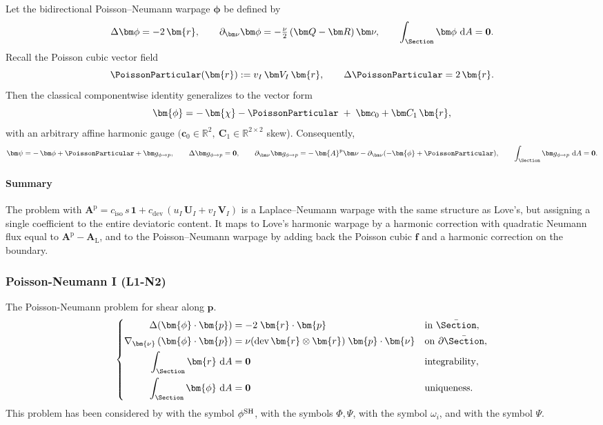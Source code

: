 Let the bidirectional Poisson–Neumann warpage $\bm{\phi}$ be defined by
\[
\Delta\bm\phi=-2\,\bm{r},\qquad
\partial_{\bm\nu}\bm\phi=-\tfrac{\nu}{2}\,(\bm Q-\bm R)\,\bm\nu,\qquad
\int_{\Section}\bm\phi\mathrm{~d}A=\mathbf{0}.
\]
Recall the Poisson cubic vector field
\[
\PoissonParticular(\bm{r}) := v_I\,\bm V_I\,\bm{r},\qquad \Delta \PoissonParticular = 2\,\bm{r}.
\]
Then the classical componentwise identity generalizes to the vector form
\[
\bm{\phi} = -\,\bm{\chi} - \PoissonParticular \;+\; \bm c_0 + \bm C_1\,\bm{r},
\]
with an arbitrary affine harmonic gauge $(\bm c_0\in\mathbb R^2,\ \bm C_1\in\mathbb R^{2\times 2}$ skew). Consequently,
\[
\bm\psi = -\,\bm\phi + \PoissonParticular + \bm g_{\phi\to p},\qquad
\Delta \bm g_{\phi\to p}=\mathbf{0},\qquad
\partial_{\bm\nu}\bm g_{\phi\to p}=-\,\bm{A}^{\mathrm p}\bm\nu - \partial_{\bm\nu}(-\bm{\phi}+\PoissonParticular),\qquad
\int_{\Section}\bm g_{\phi\to p}\mathrm{~d}A=\mathbf{0}.
\]

\paragraph{Summary}

The problem with $\bm{A}^{\mathrm p}=c_{\mathrm{iso}}\,s\,\bm 1+c_{\mathrm{dev}}\,(u_I\,\bm U_I+v_I\,\bm V_I)$ is a Laplace–Neumann warpage with the same structure as Love’s, but assigning a single coefficient to the entire deviatoric content. It maps to Love’s harmonic warpage by a harmonic correction with quadratic Neumann flux equal to $\bm{A}^{\mathrm p}-\bm{A}_{\mathrm L}$, and to the Poisson–Neumann warpage by adding back the Poisson cubic $\bm f$ and a harmonic correction on the boundary.


\subsubsection{Poisson-Neumann I (L1-N2)}
The Poisson-Neumann problem for shear along \(\bm{p}\). 
\begin{equation}
\left\{
\begin{aligned}
\Delta (\bm{\phi}\cdot\bm{p}) &= -2 \;\bm{r}\cdot\bm{p} && \text{in } \bar{\Section},\\
\nabla_{\bm{\nu}}\,(\bm{\phi}\cdot\bm{p}) &=\nu (\operatorname{dev} \bm{r}\otimes\bm{r})\;\bm{p} \cdot\bm{\nu} && \text{on } \partial \bar{\Section}, \\
\int_{\Section}\bm{r}\mathrm{~d}A &= \mathbf{0} && \text{integrability},\\
\int_{\Section}\bm{\phi}\mathrm{~d}A & = \mathbf{0} && \text{uniqueness}.
\end{aligned}
\right.
\end{equation}
This problem has been considered by \cite{romano2012torsion} with the symbol \(\phi^{\rm SH}\), \cite{pilkey2003analysis} with the symbols \(\Phi,\Psi\), 
\cite{lacarbonara2007solution} with the symbol \(\omega_i\),
and \cite{hjelmstad1983seismic} with the symbol \(\Psi\).


